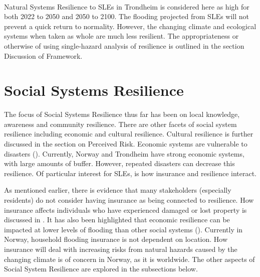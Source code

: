 \paragraph{}
Natural Systems Resilience to SLEs in Trondheim is considered here as high for both 2022 to 2050 and 2050 to 2100. The flooding projected from SLEs will not prevent a quick return to normality. However, the changing climate and ecological systems when taken as whole are much less resilient. The appropriateness or otherwise of using single-hazard analysis of resilience is outlined in the section Discussion of Framework.



\section{Social Systems Resilience}
The focus of Social Systems Resilience thus far has been on local knowledge, awareness and community resilience. There are other facets of social system resilience including economic and cultural resilience. Cultural resilience is further discussed in the section on Perceived Risk. Economic systems are vulnerable to disasters (\cite{head_comment_2020}). Currently, Norway and Trondheim have strong economic systems, with large amounts of buffer. However, repeated disasters can decrease this resilience. Of particular interest for SLEs, is how insurance and resilience interact.

As mentioned earlier, there is evidence that many stakeholders (especially residents) do not consider having insurance as being connected to resilience. How insurance affects individuals who have experienced damaged or lost property is discussed in \cite{whitmarsh_are_2008}. It has also been highlighted that economic resilience can be impacted at lower levels of flooding than other social systems (\cite{cutter_community_2020}). Currently in Norway, household flooding insurance is not dependent on location.  How insurance will deal with increasing risks from natural hazards caused by the changing climate is of concern in Norway, as it is worldwide. The other aspects of Social System Resilience are explored in the subsections below.


